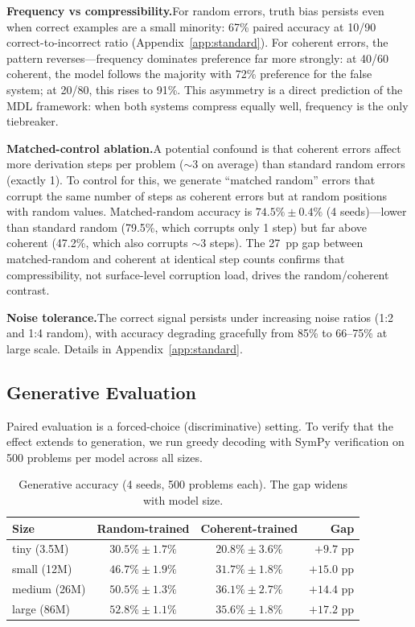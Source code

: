 \documentclass{article}
\begin{document}
\textbf{Frequency vs compressibility.}\quad For random errors, truth bias persists even when correct examples are a small minority: 67\% paired accuracy at 10/90 correct-to-incorrect ratio (Appendix~\ref{app:standard}). For coherent errors, the pattern reverses---frequency dominates preference far more strongly: at 40/60 coherent, the model follows the majority with 72\% preference for the false system; at 20/80, this rises to 91\%. This asymmetry is a direct prediction of the MDL framework: when both systems compress equally well, frequency is the only tiebreaker.

\textbf{Matched-control ablation.}\quad A potential confound is that coherent errors affect more derivation steps per problem (${\sim}3$ on average) than standard random errors (exactly 1). To control for this, we generate ``matched random'' errors that corrupt the same number of steps as coherent errors but at random positions with random values. Matched-random accuracy is $74.5\% \pm 0.4\%$ (4 seeds)---lower than standard random (79.5\%, which corrupts only 1 step) but far above coherent (47.2\%, which also corrupts ${\sim}3$ steps). The 27~pp gap between matched-random and coherent at identical step counts confirms that compressibility, not surface-level corruption load, drives the random/coherent contrast.

\textbf{Noise tolerance.}\quad The correct signal persists under increasing noise ratios (1:2 and 1:4 random), with accuracy degrading gracefully from 85\% to 66--75\% at large scale. Details in Appendix~\ref{app:standard}.

\subsection{Generative Evaluation}
\label{sec:generative}

Paired evaluation is a forced-choice (discriminative) setting. To verify that the effect extends to generation, we run greedy decoding with SymPy verification on 500 problems per model across all sizes.

\begin{table}[t]
\centering
\begin{tabular}{lccr}
\toprule
Size & Random-trained & Coherent-trained & Gap \\
\midrule
tiny (3.5M)   & $30.5\% \pm 1.7\%$ & $20.8\% \pm 3.6\%$ & $+9.7$ pp \\
small (12M)   & $46.7\% \pm 1.9\%$ & $31.7\% \pm 1.8\%$ & $+15.0$ pp \\
medium (26M)  & $50.5\% \pm 1.3\%$ & $36.1\% \pm 2.7\%$ & $+14.4$ pp \\
large (86M)   & $52.8\% \pm 1.1\%$ & $35.6\% \pm 1.8\%$ & $+17.2$ pp \\
\bottomrule
\end{tabular}
\caption{Generative accuracy (4 seeds, 500 problems each). The gap widens with model size.}
\label{tab:generative}
\end{table}
\end{document}
